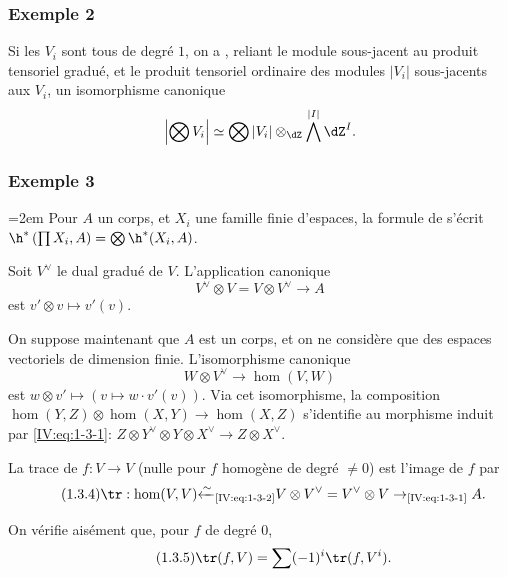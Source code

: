 \subsubsection*{Exemple 2}

Si les $V_i$ sont tous de degré $1$, on a , reliant le module sous-jacent au 
produit tensoriel gradué, et le produit tensoriel ordinaire des modules 
$|V_i|$ sous-jacents aux $V_i$, un isomorphisme canonique 
\[
  \left|\bigotimes V_i\right| \simeq \bigotimes |V_i|\otimes_{\dZ}\bigwedge^{|I|}\dZ^I \text{.}
\]





\subsubsection*{Exemple 3}

\begingroup
\emergencystretch=2em\relax
Pour $A$ un corps, et $X_i$ une famille finie d'espaces, la formule de 
 s'écrit 
$\h^*\left(\prod X_i,A\right) = \bigotimes \h^*(X_i,A)$.\par
\endgroup 

Soit $V^\vee$ le dual gradué de $V$. L'application canonique 
\begin{equation*}\tag{1.3.1}\label{IV:eq:1-3-1}
  V^\vee\otimes V = V\otimes V^\vee \to A
\end{equation*}
est $v'\otimes v\mapsto v'(v)$. 

On suppose maintenant que $A$ est un corps, et on ne considère que des 
espaces vectoriels de dimension finie. L'isomorphisme canonique 
\begin{equation*}\tag{1.3.2}\label{IV:eq:1-3-2}
  W\otimes V^\vee \to \hom(V,W) 
\end{equation*}
est $w\otimes v'\mapsto \left(v\mapsto w\cdot v'(v)\right)$. Via cet 
isomorphisme, la composition $\hom(Y,Z)\otimes \hom(X,Y)\to \hom(X,Z)$ 
s'identifie au morphisme induit par \eqref{IV:eq:1-3-1}: 
$Z\otimes Y^\vee\otimes Y\otimes X^\vee \to Z\otimes X^\vee$. 

La trace de $f:V\to V$ (nulle pour $f$ homogène de degré $\ne 0$) est 
l'image de $f$ par 
\begin{equation*}\tag{1.3.4}\label{IV:eq:1-3-4}
  \tr:\hom(V,V) {\xleftarrow\sim}_\text{\eqref{IV:eq:1-3-2}} V\otimes V^\vee = V^\vee \otimes V \to_\text{\eqref{IV:eq:1-3-1}} A .
\end{equation*}

On vérifie aisément que, pour $f$ de degré $0$, 
\begin{equation*}\tag{1.3.5}\label{IV:eq:1-3-5}
  \tr(f,V) = \sum (-1)^i \tr(f,V^i) \text{.}
\end{equation*}

